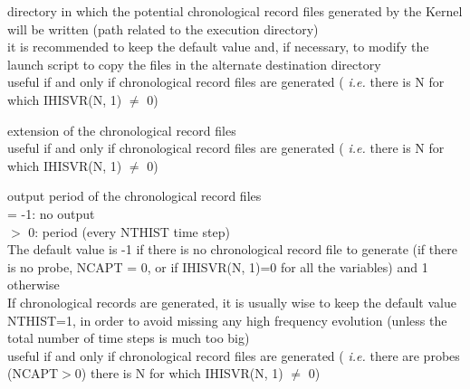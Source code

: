 {directory in which the potential chronological record files generated by
the Kernel will be written (path related to the execution directory)\\
it is recommended to keep the default value and, if necessary, to modify the
launch script to copy the files in the alternate destination directory\\
useful if and only if chronological record files are generated ({\em
i.e.} there is N for which IHISVR(N, 1) $\ne$ 0)}

{extension of the chronological record files\\
useful if and only if chronological record files are generated ({\em
i.e.} there is N for which IHISVR(N, 1) $\ne$ 0)}

{output period of the chronological record files\\
\hspace*{1.3cm}= -1: no output\\
\hspace*{1.3cm}$>$ 0: period  (every NTHIST time step)\\
The default value is -1 if there is no chronological record file to
generate (if there is no probe, NCAPT = 0, or if IHISVR(N, 1)=0 for
all the variables) and 1 otherwise\\
If chronological records are generated, it is usually wise to keep the default
value NTHIST=1, in order to avoid missing any high frequency evolution (unless
the total number of time steps is much too big)\\
useful if and only if chronological record files are generated ({\em
i.e.} there are probes (NCAPT$>$0) there is N for which IHISVR(N, 1)
$\ne$ 0)}

